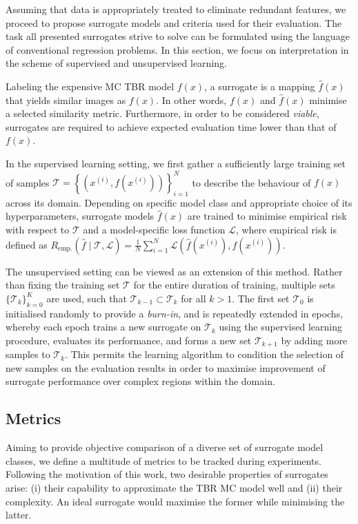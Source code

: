 Assuming that data is appropriately treated to eliminate redundant
features, we proceed to propose surrogate models and criteria
used for their evaluation. The task all presented surrogates strive to solve can be
formulated using the language of conventional regression problems. In this section,
we focus on interpretation in the scheme of supervised and unsupervised learning.

Labeling the expensive MC TBR model $f(x)$, a surrogate is a mapping
$\hat{f}(x)$ that yields similar images as $f(x)$. In other words, $f(x)$ and
$\hat{f}(x)$ minimise a selected similarity metric. Furthermore, in order to
be considered \textit{viable}, surrogates are required to achieve expected evaluation time
lower than that of $f(x)$.

In the supervised learning setting, we first gather a sufficiently large
training set of samples $\mathcal{T}=\left\{\left( x^{(i)},f\left(x^{(i)}\right) \right)\right\}_{i=1}^N$
to describe the behaviour of $f(x)$ across its domain.
Depending on specific model class and appropriate choice of its
hyperparameters, surrogate models $\hat{f}(x)$ are trained to minimise
empirical risk with respect to $\mathcal{T}$ and a model-specific
loss function $\mathcal{L}$, where empirical risk is defined as
$R_{\text{emp.}}(\hat{f}\mid\mathcal{T},\mathcal{L})
	=\frac{1}{N}\sum_{i=1}^N
	\mathcal{L}\left(\hat{f}(x^{(i)}),f(x^{(i)})\right)$.


The unsupervised setting can be viewed as an extension of this method.
Rather than fixing the training set $\mathcal{T}$ for the entire duration of
training, multiple sets $\{\mathcal{T}_k\}_{k=0}^K$ are used, such that
$\mathcal{T}_{k-1}\subset\mathcal{T}_k$ for all $k>1$. The first set
$\mathcal{T}_0$ is initialised randomly to provide a \textit{burn-in}, and is
repeatedly extended in epochs, whereby each epoch trains a new surrogate on
$\mathcal{T}_k$ using the supervised learning procedure, evaluates its
performance, and forms a new set $\mathcal{T}_{k+1}$ by adding more samples to
$\mathcal{T}_k$. This permits the learning algorithm to condition the selection
of new samples on the evaluation results in order to maximise improvement of
surrogate performance over complex regions within the domain.


\subsection{Metrics}
\label{sec:metrics}

Aiming to provide objective comparison of a diverse set of surrogate model
classes, we define a multitude of metrics to be tracked during experiments.
Following the motivation of this work, two desirable properties of surrogates
arise: (i) their capability to approximate the TBR MC model well and (ii) their
complexity. An ideal surrogate would maximise
the former while minimising the latter.

